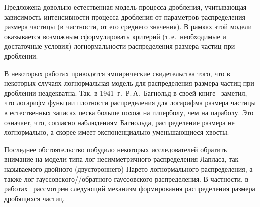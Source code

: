 \begin{multicols}{2}
Предложена довольно естественная модель процесса дробления,
учи\-ты\-ва\-ющая зависимость интенсивности процесса дробления от
параметров распределения размера частицы (в частности, от его
среднего значения). В рамках этой модели оказывается возможным
сформулировать критерий (т.\,е.\ необходимые и достаточные условия)
логнормальности распределения размера частиц при дроб\-лении.

В некоторых работах приводятся эмпирические свидетельства того,
что в некоторых случаях лог\-нор\-маль\-ная модель для распределения
размера час\-тиц при дроблении неадекватна. Так, в 1941~г.\ Р.\,А.~Багнольд
в своей книге~\cite{3kk} заметил, что логарифм функции плотности
распределения для логарифма размера частицы в естественных запасах
песка больше похож на гиперболу, чем на параболу. Это означает,
что, согласно наблюдениям Багнольда, распределение размера не
логнормально, а скорее имеет экспоненциально уменьшающиеся хвосты.

Последнее обстоятельство побудило некоторых исследователей
обратить внимание на модели типа лог-несимметричного распределения\linebreak
Лап\-ла\-са, так называемого двойного (двустороннего)
Парето-логнормального распределения, а также
лог-гауссовского/\!/обратного гауссовского распределения. В
частности, в работах~\cite{4kk, 5kk} рассмотрен следующий механизм
формирования распределения размера дробящихся частиц.


\end{multicols}
